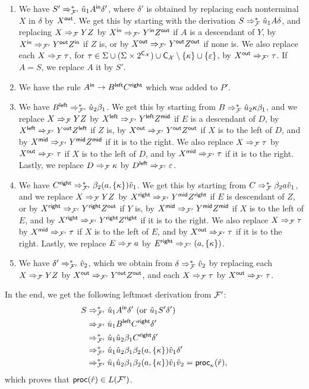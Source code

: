 \begin{enumerate}
	\item We have $S' \Rightarrow_{\mathcal{F}'}^* \hat{u}_1 A^{\mathsf{in}} \delta'$, where $\delta'$ is obtained by replacing each nonterminal $X$ in $\delta$ by $X^{\mathsf{out}}$. We get this by starting with the derivation $S \Rightarrow_{\mathcal{F}}^* \hat{u}_1 A \delta$, and replacing $X\Rightarrow_{\mathcal{F}} YZ$ by $X^{\mathsf{in}}\Rightarrow_{\mathcal{F}'} Y^{\mathsf{in}}Z^{\mathsf{out}}$ if $A$ is a descendant of $Y$, by $X^{\mathsf{in}}\Rightarrow_{\mathcal{F}'} Y^{\mathsf{out}}Z^{\mathsf{in}}$ if $Z$ is, or by $X^{\mathsf{out}}\Rightarrow_{\mathcal{F}'} Y^{\mathsf{out}}Z^{\mathsf{out}}$ if none is. We also replace each $X\Rightarrow_{\mathcal{F}} \tau$, for $\tau\in\Sigma\cup(\Sigma\times 2^{\textsf{C}_{\mathcal{X}}})\cup \textsf{C}_{\mathcal{X}}\setminus\{\kappa\}\cup\{\varepsilon\}$, by $X^{\mathsf{out}}\Rightarrow_{\mathcal{F}'}\tau$. If $A = S$, we replace $A$ it by $S'$.
	\item We have the rule $A^{\mathsf{in}} \to B^{\mathsf{left}} C^{\mathsf{right}}$ which was added to $P'$.
	\item We have $B^{\mathsf{left}}\Rightarrow_{\mathcal{F}'}^* \hat{u}_2 \beta_1$. We get this by starting from $B\Rightarrow_{\mathcal{F}}^*\hat{u}_2\kappa\beta_1$, and we replace $X\Rightarrow_{\mathcal{F}} YZ$ by $X^{\mathsf{left}}\Rightarrow_{\mathcal{F}'} Y^{\mathsf{left}} Z^{\mathsf{mid}}$ if $E$ is a descendant of $D$, by $X^{\mathsf{left}}\Rightarrow_{\mathcal{F}'} Y^{\mathsf{out}} Z^{\mathsf{left}}$ if $Z$ is, by $X^{\mathsf{out}}\Rightarrow_{\mathcal{F}'} Y^{\mathsf{out}} Z^{\mathsf{out}}$ if $X$ is to the left of $D$, and by $X^{\mathsf{mid}}\Rightarrow_{\mathcal{F}'} Y^{\mathsf{mid}} Z^{\mathsf{mid}}$ if it is to the right. We also replace $X\Rightarrow_{\mathcal{F}} \tau$ by $X^{\mathsf{out}}\Rightarrow_{\mathcal{F}'}\tau$ if $X$ is to the left of $D$, and by $X^{\mathsf{mid}}\Rightarrow_{\mathcal{F}'}\tau$ if it is to the right. Lastly, we replace $D\Rightarrow_{\mathcal{F}}\kappa$ by $D^{\mathsf{left}}\Rightarrow_{\mathcal{F}'}\varepsilon$.
	\item We have $C^{\mathsf{right}}\Rightarrow_{\mathcal{F}'}^* \beta_2(a,\{\kappa\})\hat{v}_1$. We get this by starting from $C\Rightarrow_{\mathcal{F}}^*\beta_2 a \hat{v}_1$, and we replace $X\Rightarrow_{\mathcal{F}} YZ$ by $X^{\mathsf{right}}\Rightarrow_{\mathcal{F}'} Y^{\mathsf{mid}} Z^{\mathsf{right}}$ if $E$ is descendant of $Z$, or by $X^{\mathsf{right}}\Rightarrow_{\mathcal{F}'} Y^{\mathsf{right}} Z^{\mathsf{out}}$ if $Y$ is, by $X^{\mathsf{mid}}\Rightarrow_{\mathcal{F}'} Y^{\mathsf{mid}} Z^{\mathsf{mid}}$ if $X$ is to the left of $E$, and by $X^{\mathsf{right}}\Rightarrow_{\mathcal{F}'} Y^{\mathsf{right}} Z^{\mathsf{right}}$ if it is to the right. We also replace $X\Rightarrow_{\mathcal{F}} \tau$ by $X^{\mathsf{mid}}\Rightarrow_{\mathcal{F}'}\tau$ if $X$ is to the left of $E$, and by $X^{\mathsf{out}}\Rightarrow_{\mathcal{F}'}\tau$ if it is to the right. Lastly, we replace $E\Rightarrow_{\mathcal{F}} a$ by $E^{\mathsf{right}}\Rightarrow_{\mathcal{F}'}(a, \{\kappa\})$.
	\item We have $\delta'\Rightarrow_{\mathcal{F}'}^*\hat{v}_2$, which we obtain from $\delta\Rightarrow_{\mathcal{F}}^*\hat{v}_2$ by replacing each $X \Rightarrow_{\mathcal{F}} YZ$ by $X^{\mathsf{out}}\Rightarrow_{\mathcal{F}'} Y^{\mathsf{out}} Z^{\mathsf{out}}$, and each $X\Rightarrow_{\mathcal{F}}\tau$ by $X^{\mathsf{out}}\Rightarrow_{\mathcal{F}'}\tau$.
\end{enumerate}
In the end, we get the following leftmost derivation from $\mathcal{F}'$:
\begin{align*}
	S  &\Rightarrow_{\mathcal{F}'}^* 
	\hat{u}_1 A^{\mathsf{in}} \delta'\ (\text{or } \hat{u}_1 S' \delta') \\
	&\Rightarrow_{\mathcal{F}'} 
	\hat{u}_1 B^{\mathsf{left}} C^{\mathsf{right}} \delta' \\
	&\Rightarrow_{\mathcal{F}'}^* 
	\hat{u}_1 \hat{u}_2 \beta_1 C^{\mathsf{right}} \delta' \\
	&\Rightarrow_{\mathcal{F}'}^*
	\hat{u}_1 \hat{u}_2 \beta_1 \beta_2 (a, \{\kappa\}) \hat{v}_1 \delta' \\
	&\Rightarrow_{\mathcal{F}'}^* 
	\hat{u}_1 \hat{u}_2 \beta_1 \beta_2 (a, \{\kappa\}) \hat{v}_1 \hat{v}_2 = \mathsf{proc}_\kappa(\hat{r}),
\end{align*}
which proves that $\mathsf{proc}(\hat{r})\in L(\mathcal{F}')$. 

